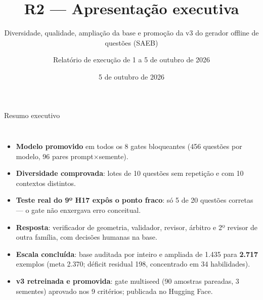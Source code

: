 \documentclass[aspectratio=169,11pt]{beamer}
\title[R2 — 01 a 05/10/2026]{R2 — Apresentação executiva}
\subtitle{Diversidade, qualidade, ampliação da base e promoção da v3 do gerador offline de questões (SAEB)}
\author{Relatório de execução de 1 a 5 de outubro de 2026}
\institute{Qwen3-1.7B + QLoRA + GGUF — geração offline no aplicativo}
\date{5 de outubro de 2026}
\newcommand{\okmark}{{\color{okgreen}\faCheckCircle}}
\newcommand{\warnmark}{{\color{warnorange}\faExclamationTriangle}}
\begin{document}
\begin{frame}
  \titlepage
\end{frame}

\begin{frame}{Resumo executivo}
  \begin{columns}[T]
    \begin{itemize}\setlength\itemsep{5pt}
      \item[\okmark] \textbf{Modelo promovido} em todos os 8 gates bloqueantes (456 questões por modelo, 96 pares prompt$\times$semente).
      \item[\okmark] \textbf{Diversidade comprovada}: lotes de 10 questões sem repetição e com 10 contextos distintos.
      \item[\warnmark] \textbf{Teste real do 9º H17 expôs o ponto fraco}: só 5 de 20 questões corretas --- o gate não enxergava erro conceitual.
      \item[\faTools] \textbf{Resposta}: verificador de geometria, validador, revisor, árbitro e 2º revisor de outra família, com decisões humanas na base.
      \item[\okmark] \textbf{Escala concluída}: base auditada por inteiro e ampliada de 1.435 para \textbf{2.717} exemplos (meta 2.370; déficit residual 198, concentrado em 34 habilidades).
      \item[\okmark] \textbf{v3 retreinada e promovida}: gate multiseed (90 amostras pareadas, 3 sementes) aprovado nos 9 critérios; publicada no Hugging Face.
    \end{itemize}
  \end{columns}
\end{frame}
\end{document}
